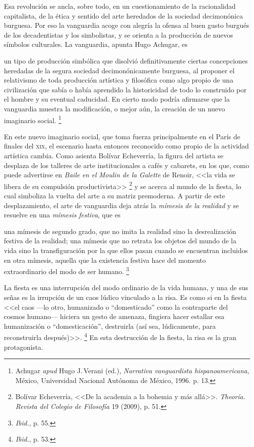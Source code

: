 \documentclass[14pt,twoside,final]{extbook} %
\let\oldfootnote\footnote
\renewcommand\footnote[1]{%
\oldfootnote{\hspace{1mm}#1}}
\newcommand{\nota}[1]{\marginpar{\color{blue}\tiny #1}}%
\begin{document}
Esa revolución se ancla, sobre todo, en un cuestionamiento de la racionalidad capitalista, de la ética y sentido del arte heredados de la sociedad decimonónica burguesa. Por eso la vanguardia acoge con alegría la ofensa al buen gusto burgués de los decadentistas y los simbolistas, y se orienta a la producción de nuevos símbolos culturales. La vanguardia, apunta Hugo Achugar, es
\begin{quoting}
un tipo de producción simbólica que disolvió definitivamente ciertas concepciones heredadas de la segura sociedad decimonónicamente burguesa, al proponer el relativismo de toda producción artística y filosófica como algo propio de una civilización que sabía o había aprendido la historicidad de todo lo construido por el hombre y su eventual caducidad. En cierto modo podría afirmarse que la vanguardia muestra la modificación, o mejor aún, la creación de un nuevo imaginario social.\footnote{Achugar \emph{apud} Hugo J.\,Verani (ed.), \emph{Narrativa vanguardista hispanoamericana}, México, Universidad Nacional Autónoma de México, 1996. p. 13.}
\end{quoting}
En este nuevo imaginario social, que toma fuerza principalmente en el París de finales del \textsc{xix}, el escenario hasta entonces reconocido como propio de la actividad artística cambia. Como asienta Bolívar Echeverría, la figura del artista se desplaza de los talleres de arte institucionales a cafés y cabarets, en los que, como puede advertirse en \emph{Baile en el Moulin de la Galette} de Renoir, <<la vida se libera de su compulsión productivista>>\footnote{Bolívar Echeverría, <<De la academia a la bohemia y más allá>>. \emph{Theoría. Revista del Colegio de Filosofía} 19 (2009), p. 51.} y se acerca al mundo de la fiesta, lo cual simboliza la vuelta del arte a su matriz premoderna. A partir de este desplazamiento, el arte de vanguardia deja atrás la \emph{mímesis de la realidad} y se resuelve en una \emph{mímesis festiva}, que es
\begin{quoting}
una mímesis de segundo grado, que no imita\reversemarginpar\nota{homeotéleutones} la realidad sino la desrealización festiva de la realidad; una mímesis que no retrata los objetos del mundo de la vida sino la transfiguración por la que ellos pasan cuando se encuentran incluidos en otra mímesis, aquella que la existencia festiva hace del momento extraordinario del modo de ser humano.\footnote{\emph{Ibid.}, p. 55.}
\end{quoting}
La fiesta es una interrupción del modo ordinario de la vida humana, y una de sus señas es la irrupción de un caos lúdico vinculado a la risa. Es como si en la fiesta <<el caos ---lo otro, humanizado o ``domesticado'' como la contraparte del cosmos humano--- hiciera un gesto de amenaza, fingiera hacer estallar esa humanización o ``domesticación'', destruirla (así sea, lúdicamente, para reconstruirla después)>>.\footnote{\emph{Ibid.}, p. 53.} En esta destrucción de la fiesta, la risa es la gran protagonista.
\end{document}
